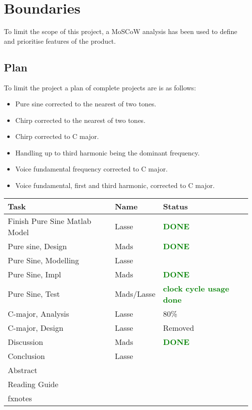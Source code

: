 
\chapter{Boundaries}
\label{sec:Boundaries}
To limit the scope of this project, a MoSCoW analysis has been used to define and prioritise features of the product.

\section{Plan}
To limit the project a plan of complete projects are is as follows:

\begin{itemize}
	\item Pure sine corrected to the nearest of two tones.
	\item Chirp corrected to the nearest of two tones.
	\item Chirp corrected to C major.
	\item Handling up to third harmonic being the dominant frequency.
	\item Voice fundamental frequency corrected to C major.
	\item Voice fundamental, first and third harmonic, corrected to C major.
\end{itemize}

\begin{table}
	\centering
	\begin{tabular}{l l l}
		\toprule
		Task & Name & Status \\
		\midrule
		Finish Pure Sine Matlab Model & Lasse & \textcolor{green}{\textbf{DONE}} \\
		Pure sine, Design & Mads & \textcolor{green}{\textbf{DONE}}\\
		Pure Sine, Modelling & Lasse & \\
		Pure Sine, Impl & Mads & \textcolor{green}{\textbf{DONE}} \\
		Pure Sine, Test & Mads/Lasse & \textcolor{green}{\textbf{clock cycle usage done}}\\
		C-major, Analysis & Lasse & 80\% \\
		C-major, Design & Lasse & Removed \\
		Discussion & Mads & \textcolor{green}{\textbf{DONE}}\\
		Conclusion & Lasse & \\
		Abstract & & \\
		Reading Guide & & \\
		fxnotes & & \\
		\bottomrule
	\end{tabular}
\end{table}
